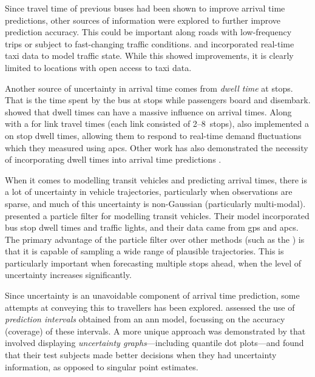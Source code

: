 Since travel time of previous buses had been shown to improve arrival time predictions, other sources of information were explored to further improve prediction accuracy. This could be important along roads with low-frequency trips or subject to fast-changing traffic conditions.  and \citet{Ma_2019} incorporated real-time taxi data to model traffic state. While this showed improvements, it is clearly limited to locations with open access to taxi data.


Another source of uncertainty in arrival time comes from \emph{dwell time} at stops. That is the time spent by the bus at stops while passengers board and disembark.  showed that dwell times can have a massive influence on arrival times. Along with a \kf{} for link travel times (each link consisted of 2--8~stops), \citeauthor{Shalaby_2004} also implemented a \kf{} on stop dwell times, allowing them to respond to real-time demand fluctuations which they measured using \glspl{apc}. Other work has also demonstrated the necessity of incorporating dwell times into arrival time predictions \citep{Jeong_2005,Cats_2015,Cats_2016}.


When it comes to modelling transit vehicles and predicting arrival times, there is a lot of uncertainty in vehicle trajectories, particularly when observations are sparse, and much of this uncertainty is non-Gaussian (particularly multi-modal).  presented a particle filter for modelling transit vehicles. Their model incorporated bus stop dwell times and traffic lights, and their data came from \gls{gps} and \glspl{apc}. The primary advantage of the particle filter over other methods (such as the \kf{}) is that it is capable of sampling a wide range of plausible trajectories. This is particularly important when forecasting multiple stops ahead, when the level of uncertainty increases significantly.


Since uncertainty is an unavoidable component of arrival time prediction, some attempts at conveying this to travellers has been explored.  assessed the use of \emph{prediction intervals} obtained from an \gls{ann} model, focussing on the accuracy (coverage) of these intervals. A more unique approach was demonstrated by \citet{Fernandes_2018} that involved displaying \emph{uncertainty graphs}---including quantile dot plots---and found that their test subjects made better decisions when they had uncertainty information, as opposed to singular point estimates.


